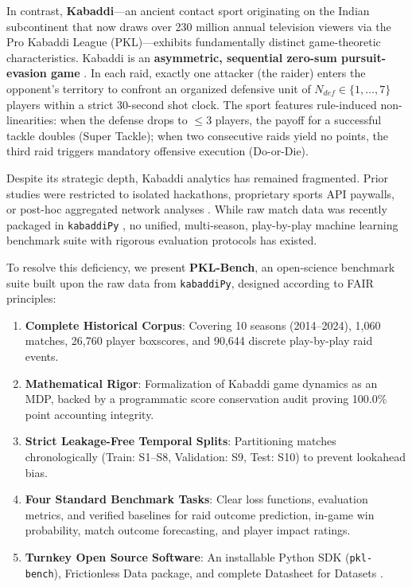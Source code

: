 \documentclass[11pt,a4paper]{article}
\begin{document}
In contrast, \textbf{Kabaddi}---an ancient contact sport originating on the Indian subcontinent that now draws over 230 million annual television viewers via the Pro Kabaddi League (PKL)---exhibits fundamentally distinct game-theoretic characteristics. Kabaddi is an \textbf{asymmetric, sequential zero-sum pursuit-evasion game} \cite{isaacs1999differential}. In each raid, exactly one attacker (the raider) enters the opponent's territory to confront an organized defensive unit of $N_{def} \in \{1, \dots, 7\}$ players within a strict 30-second shot clock. The sport features rule-induced non-linearities: when the defense drops to $\le 3$ players, the payoff for a successful tackle doubles (Super Tackle); when two consecutive raids yield no points, the third raid triggers mandatory offensive execution (Do-or-Die).

Despite its strategic depth, Kabaddi analytics has remained fragmented. Prior studies were restricted to isolated hackathons, proprietary sports API paywalls, or post-hoc aggregated network analyses \cite{sengupta2024analyzing, lalwani2024kabaddipy}. While raw match data was recently packaged in \texttt{kabaddiPy} \cite{lalwani2024kabaddipy}, no unified, multi-season, play-by-play machine learning benchmark suite with rigorous evaluation protocols has existed.

To resolve this deficiency, we present \textbf{PKL-Bench}, an open-science benchmark suite built upon the raw data from \texttt{kabaddiPy}, designed according to FAIR principles:
\begin{enumerate}
    \item \textbf{Complete Historical Corpus}: Covering 10 seasons (2014--2024), 1,060 matches, 26,760 player boxscores, and 90,644 discrete play-by-play raid events.
    \item \textbf{Mathematical Rigor}: Formalization of Kabaddi game dynamics as an MDP, backed by a programmatic score conservation audit proving 100.0\% point accounting integrity.
    \item \textbf{Strict Leakage-Free Temporal Splits}: Partitioning matches chronologically (Train: S1--S8, Validation: S9, Test: S10) to prevent lookahead bias.
    \item \textbf{Four Standard Benchmark Tasks}: Clear loss functions, evaluation metrics, and verified baselines for raid outcome prediction, in-game win probability, match outcome forecasting, and player impact ratings.
    \item \textbf{Turnkey Open Source Software}: An installable Python SDK (\texttt{pkl-bench}), Frictionless Data package, and complete Datasheet for Datasets \cite{gebru2021datasheets}.
\end{enumerate}
\end{document}
